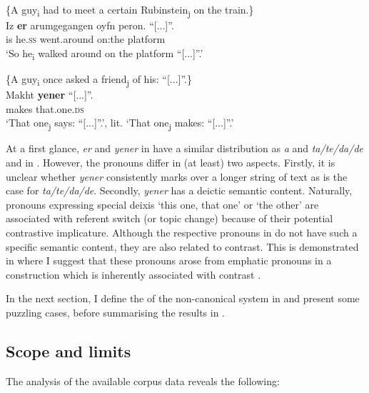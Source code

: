 \documentclass[output=paper,newtxmath,modfonts,nonflat,hidelinks]{langsci/langscibook}
\begin{document}
\ea\label{ex:apel:20}
{ \citep[311]{Prince2006}}\\
\ea\label{ex:apel:20a}
{\{A guy\textsubscript{i} had to meet a certain Rubinstein\textsubscript{j} on the train.\}}\\
\gll Iz \textbf{er} arumgegangen oyfn peron. “[...]”.\\
     is he.\textsc{ss} went.around on:the platform \\
\glt ‘So he\textsubscript{i} walked around on the platform “[...]”.’

\ex\label{ex:apel:20b}
{\{A guy\textsubscript{i} once asked a friend\textsubscript{j} of his: “[...]”.\}}\\
\gll Makht \textbf{yener} “[...]”.\\
     makes that.one.\textsc{ds} \\
\glt ‘That one\textsubscript{j} says: “[...]”.’, lit. ‘That one\textsubscript{j} makes: “[...]”.’
\z
\z

At a first glance, \textit{er} and \textit{yener} in  have a similar distribution as \textit{a} and \textit{ta/te/da/de} and in . However, the  pronouns differ in (at least) two aspects. Firstly, it is unclear whether \textit{yener} consistently marks  over a longer string of text as is the case for \textit{ta/te/da/de}. Secondly, \textit{yener} has a deictic semantic content. Naturally, pronouns expressing special deixis ‘this one, that one’ or ‘the other’ are associated with referent switch (or topic change) because of their potential contrastive implicature. Although the respective pronouns in  do not have such a specific semantic content, they are also related to contrast. This is demonstrated in  where I suggest that these pronouns arose from emphatic pronouns in a  construction which is inherently associated with contrast \citep[153]{Givon76}.

In the next section, I define the  of the non-canonical  system in  and present some puzzling cases, before summarising the results in . 

\subsection{Scope and limits}\label{sec:apel:3.2}

The analysis of the available corpus data reveals the following: 
\end{document}
